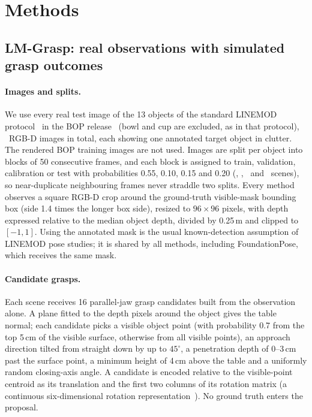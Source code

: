 \section{Methods}\label{sec:methods}

\subsection{LM-Grasp: real observations with simulated grasp outcomes}
\paragraph{Images and splits.} We use every real test image of the 13 objects of the standard LINEMOD protocol~\cite{hinterstoisser2012} in the BOP release~\cite{hodan2018bop} (bowl and cup are excluded, as in that protocol), \NScenes\ RGB-D images in total, each showing one annotated target object in clutter. The rendered BOP training images are not used. Images are split per object into blocks of 50 consecutive frames, and each block is assigned to train, validation, calibration or test with probabilities 0.55, 0.10, 0.15 and 0.20 (\NTrain, \NVal, \NCalib\ and \NTest\ scenes), so near-duplicate neighbouring frames never straddle two splits. Every method observes a square RGB-D crop around the ground-truth visible-mask bounding box (side 1.4 times the longer box side), resized to $96\times96$ pixels, with depth expressed relative to the median object depth, divided by 0.25\,m and clipped to $[-1,1]$. Using the annotated mask is the usual known-detection assumption of LINEMOD pose studies; it is shared by all methods, including FoundationPose, which receives the same mask.

\paragraph{Candidate grasps.} Each scene receives 16 parallel-jaw grasp candidates built from the observation alone. A plane fitted to the depth pixels around the object gives the table normal; each candidate picks a visible object point (with probability 0.7 from the top 5\,cm of the visible surface, otherwise from all visible points), an approach direction tilted from straight down by up to $45^\circ$, a penetration depth of 0--3\,cm past the surface point, a minimum height of 4\,cm above the table and a uniformly random closing-axis angle. A candidate is encoded relative to the visible-point centroid as its translation and the first two columns of its rotation matrix (a continuous six-dimensional rotation representation~\cite{zhou2019rotation}). No ground truth enters the proposal.

